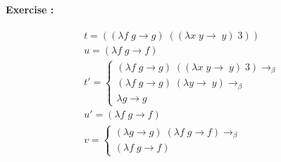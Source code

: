 \documentclass[10pt,a4paper]{article}
\newcounter{ExerciseCount}
\newcommand{\exercise}[1]{\noindent \textbf{Exercise \theExerciseCount:}
  
  \vspace{0.15cm}
 #1 \addtocounter{ExerciseCount}{1}
}
\begin{document}
\exercise{
  \begin{align*}
      \begin{array}{l}
         t = ((\lambda f \; g \rightarrow g) \; ((\lambda x \; y \rightarrow \; y) \; 3))\\
         u = (\lambda f \; g \rightarrow f) \\
         t' = \left\lbrace
          \begin{array}{l}
          (\lambda f \; g \rightarrow g) \; ((\lambda x \; y \rightarrow \; y) \; 3) \rightarrow_\beta\\
          (\lambda f \; g \rightarrow g) \; (\lambda y \rightarrow \; y) \rightarrow_\beta\\
          \lambda g \rightarrow g
          \end{array} \right. \\
         u'= (\lambda f \; g \rightarrow f) \\
         v = \left \lbrace \begin{array}{l}
            (\lambda g \rightarrow g) \; (\lambda f \; g \rightarrow f) \rightarrow_{\beta} \\
            (\lambda f \; g \rightarrow f)
            \end{array} \right.
       \end{array}
      \end{align*}
}
\end{document}
